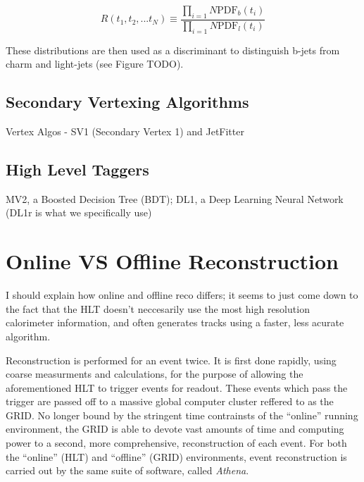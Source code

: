             \begin{equation}
                R(t_1, t_2, ... t_N) \equiv \frac{\prod_{i=1}{N} \textrm{PDF}_b(t_i)}{\prod_{i=1}{N} \textrm{PDF}_l(t_i)}
            \end{equation}

            These distributions are then used as a discriminant to distinguish b-jets from charm and light-jets
                (see Figure TODO)\cite{thesis_giacinto}.

        \subsection{Secondary Vertexing Algorithms}

            Vertex Algos - SV1 (Secondary Vertex 1) and JetFitter

        \subsection{High Level Taggers}

            MV2, a Boosted Decision Tree (BDT);
            DL1, a Deep Learning Neural Network (DL1r is what we specifically use)
            \cite{bjet_id_and_performance}
            \cite{btagging_optimisation}

    \section{Online VS Offline Reconstruction}
        I should explain how online and offline reco differs;
            it seems to just come down to the fact that the HLT doesn't neccesarily use the most high resolution calorimeter information,
            and often generates tracks using a faster, less acurate algorithm.

        Reconstruction is performed for an event twice.
        It is first done rapidly, using coarse measurments and calculations,
            for the purpose of allowing the aforementioned HLT to trigger events for readout.
        These events which pass the trigger are passed off to a massive global computer cluster reffered to as the GRID.
        No longer bound by the stringent time contrainsts of the ``online'' running environment,
            the GRID is able to devote vast amounts of time and computing power to a second, 
            more comprehensive, reconstruction of each event.
        For both the ``online'' (HLT) and ``offline'' (GRID) environments, event reconstruction is carried out by the same suite of software,
            called \textit{Athena}.

